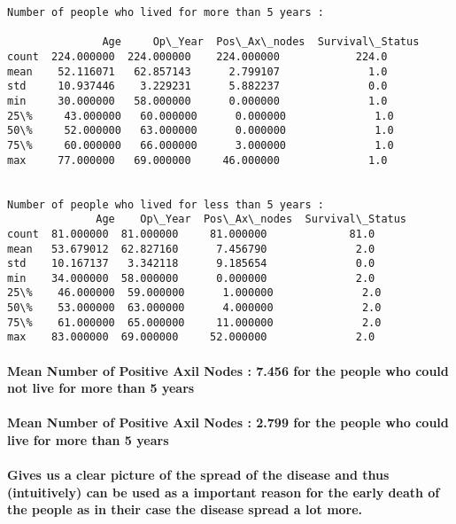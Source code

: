 \documentclass[11pt]{article}
\begin{document}
    \begin{Verbatim}[commandchars=\\\{\}]
Number of people who lived for more than 5 years : 

               Age     Op\_Year  Pos\_Ax\_nodes  Survival\_Status
count  224.000000  224.000000    224.000000            224.0
mean    52.116071   62.857143      2.799107              1.0
std     10.937446    3.229231      5.882237              0.0
min     30.000000   58.000000      0.000000              1.0
25\%     43.000000   60.000000      0.000000              1.0
50\%     52.000000   63.000000      0.000000              1.0
75\%     60.000000   66.000000      3.000000              1.0
max     77.000000   69.000000     46.000000              1.0


Number of people who lived for less than 5 years : 
              Age    Op\_Year  Pos\_Ax\_nodes  Survival\_Status
count  81.000000  81.000000     81.000000             81.0
mean   53.679012  62.827160      7.456790              2.0
std    10.167137   3.342118      9.185654              0.0
min    34.000000  58.000000      0.000000              2.0
25\%    46.000000  59.000000      1.000000              2.0
50\%    53.000000  63.000000      4.000000              2.0
75\%    61.000000  65.000000     11.000000              2.0
max    83.000000  69.000000     52.000000              2.0

    \end{Verbatim}

    \paragraph{Mean Number of Positive Axil Nodes : 7.456 for the people who
could not live for more than 5
years}\label{mean-number-of-positive-axil-nodes-7.456-for-the-people-who-could-not-live-for-more-than-5-years}

\paragraph{Mean Number of Positive Axil Nodes : 2.799 for the people who
could live for more than 5
years}\label{mean-number-of-positive-axil-nodes-2.799-for-the-people-who-could-live-for-more-than-5-years}

\paragraph{Gives us a clear picture of the spread of the disease and
thus (intuitively) can be used as a important reason for the early death
of the people as in their case the disease spread a lot
more.}\label{gives-us-a-clear-picture-of-the-spread-of-the-disease-and-thus-intuitively-can-be-used-as-a-important-reason-for-the-early-death-of-the-people-as-in-their-case-the-disease-spread-a-lot-more.}
\end{document}
